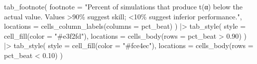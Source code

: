 \documentclass[
  letterpaper,
  DIV=11,
  numbers=noendperiod]{scrartcl}
\newenvironment{Shaded}{\begin{snugshade}}{\end{snugshade}}
\newcommand{\AttributeTok}[1]{\textcolor[rgb]{0.40,0.45,0.13}{#1}}
\newcommand{\FloatTok}[1]{\textcolor[rgb]{0.68,0.00,0.00}{#1}}
\newcommand{\FunctionTok}[1]{\textcolor[rgb]{0.28,0.35,0.67}{#1}}
\newcommand{\NormalTok}[1]{\textcolor[rgb]{0.00,0.23,0.31}{#1}}
\newcommand{\SpecialCharTok}[1]{\textcolor[rgb]{0.37,0.37,0.37}{#1}}
\newcommand{\StringTok}[1]{\textcolor[rgb]{0.13,0.47,0.30}{#1}}
\begin{document}
\begin{Shaded}
\begin{Highlighting}[]
  \FunctionTok{tab\_footnote}\NormalTok{(}
    \AttributeTok{footnote  =} \StringTok{"Percent of simulations that produce t(α) below the actual value. Values \textgreater{}90\% suggest skill; \textless{}10\% suggest inferior performance."}\NormalTok{,}
    \AttributeTok{locations =} \FunctionTok{cells\_column\_labels}\NormalTok{(}\AttributeTok{columns =}\NormalTok{ pct\_beat)}
\NormalTok{  ) }\SpecialCharTok{|\textgreater{}}
  \FunctionTok{tab\_style}\NormalTok{(}
    \AttributeTok{style     =} \FunctionTok{cell\_fill}\NormalTok{(}\AttributeTok{color =} \StringTok{"\#e3f2fd"}\NormalTok{),}
    \AttributeTok{locations =} \FunctionTok{cells\_body}\NormalTok{(}\AttributeTok{rows =}\NormalTok{ pct\_beat }\SpecialCharTok{\textgreater{}} \FloatTok{0.90}\NormalTok{)}
\NormalTok{  ) }\SpecialCharTok{|\textgreater{}}
  \FunctionTok{tab\_style}\NormalTok{(}
    \AttributeTok{style     =} \FunctionTok{cell\_fill}\NormalTok{(}\AttributeTok{color =} \StringTok{"\#fce4ec"}\NormalTok{),}
    \AttributeTok{locations =} \FunctionTok{cells\_body}\NormalTok{(}\AttributeTok{rows =}\NormalTok{ pct\_beat }\SpecialCharTok{\textless{}} \FloatTok{0.10}\NormalTok{)}
\NormalTok{  )}
\end{Highlighting}
\end{Shaded}
\end{document}
